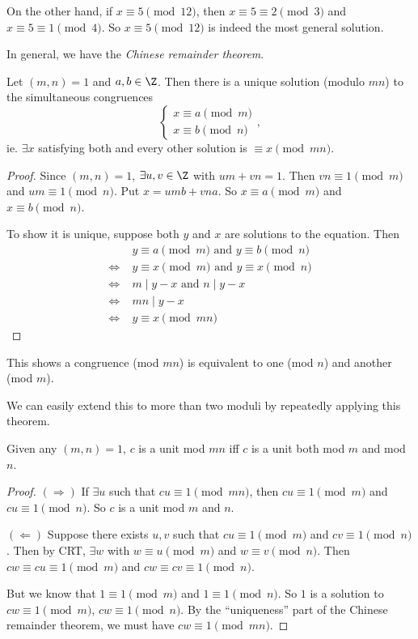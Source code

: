 \documentclass[a4paper]{article}
\begin{document}
On the other hand, if $x\equiv 5\pmod {12}$, then $x\equiv 5\equiv 2 \pmod 3$ and $x\equiv 5\equiv 1\pmod 4$. So $x\equiv 5\pmod {12}$ is indeed the most general solution.

In general, we have the \emph{Chinese remainder theorem}.
\begin{thm}
  Let $(m, n) = 1$ and $a, b\in \Z$. Then there is a unique solution (modulo $mn$) to the simultaneous congruences
  \[
    \begin{cases}x\equiv a\pmod m \\ x\equiv b\pmod n \end{cases},
  \]
  ie. $\exists x$ satisfying both and every other solution is $\equiv x \pmod {mn}$.
\end{thm}

\begin{proof}
  Since $(m, n) = 1$, $\exists u, v\in \Z$ with $um + vn = 1$. Then $vn \equiv 1\pmod m$ and $um \equiv 1 \pmod n$. Put $x = umb + vna$. So $x\equiv a\pmod m$ and $x\equiv b\pmod n$.

  To show it is unique, suppose both $y$ and $x$ are solutions to the equation. Then
  \begin{align*}
    &\; y \equiv a\pmod m \text{ and } y \equiv b\pmod n\\
    \Leftrightarrow &\; y \equiv x\pmod m \text{ and } y\equiv x\pmod n\\
    \Leftrightarrow &\; m \mid y - x\text{ and } n \mid y - x\\
    \Leftrightarrow &\; mn \mid y - x\\
    \Leftrightarrow &\; y \equiv x\pmod {mn}
  \end{align*}
\end{proof}
This shows a congruence (mod $mn$) is equivalent to one (mod $n$) and another (mod $m$).

We can easily extend this to more than two moduli by repeatedly applying this theorem.

\begin{prop}
  Given any $(m,n) = 1$, $c$ is a unit mod $mn$ iff $c$ is a unit both mod $m$ and mod $n$.
\end{prop}

\begin{proof}
  $(\Rightarrow)$ If $\exists u$ such that $cu \equiv 1 \pmod {mn}$, then $cu \equiv 1\pmod m$ and $cu\equiv 1\pmod n$. So $c$ is a unit mod $m$ and $n$.

  $(\Leftarrow)$ Suppose there exists $u, v$ such that $cu\equiv 1\pmod m$ and $cv \equiv 1\pmod n$. Then by CRT, $\exists w$ with $w\equiv u \pmod m$ and $w\equiv v\pmod n$. Then $cw\equiv cu\equiv 1\pmod m$ and $cw\equiv cv\equiv 1\pmod n$.

  But we know that $1\equiv 1\pmod m$ and $1\equiv 1\pmod n$. So $1$ is a solution to $cw \equiv 1\pmod m$, $cw\equiv 1\pmod n$. By the ``uniqueness'' part of the Chinese remainder theorem, we must have $cw\equiv 1\pmod {mn}$.
\end{proof}
\end{document}
